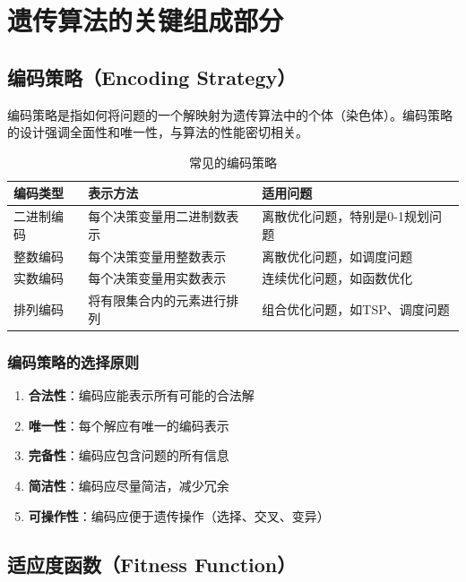 \section{遗传算法的关键组成部分}

\subsection{编码策略（Encoding Strategy）}

编码策略是指如何将问题的一个解映射为遗传算法中的个体（染色体）。编码策略的设计强调全面性和唯一性，与算法的性能密切相关。

\begin{table}[H]
\centering
\caption{常见的编码策略}
\begin{tabular}{p{}p{}p{}}
\toprule
\textbf{编码类型} & \textbf{表示方法} & \textbf{适用问题} \\
\midrule
二进制编码 & 每个决策变量用二进制数表示 & 离散优化问题，特别是0-1规划问题 \\
\hline
整数编码 & 每个决策变量用整数表示 & 离散优化问题，如调度问题 \\
\hline
实数编码 & 每个决策变量用实数表示 & 连续优化问题，如函数优化 \\
\hline
排列编码 & 将有限集合内的元素进行排列 & 组合优化问题，如TSP、调度问题 \\
\bottomrule
\end{tabular}
\end{table}

\subsubsection{编码策略的选择原则}
\begin{enumerate}
    \item \textbf{合法性}：编码应能表示所有可能的合法解
    \item \textbf{唯一性}：每个解应有唯一的编码表示
    \item \textbf{完备性}：编码应包含问题的所有信息
    \item \textbf{简洁性}：编码应尽量简洁，减少冗余
    \item \textbf{可操作性}：编码应便于遗传操作（选择、交叉、变异）
\end{enumerate}

\subsection{适应度函数（Fitness Function）}

